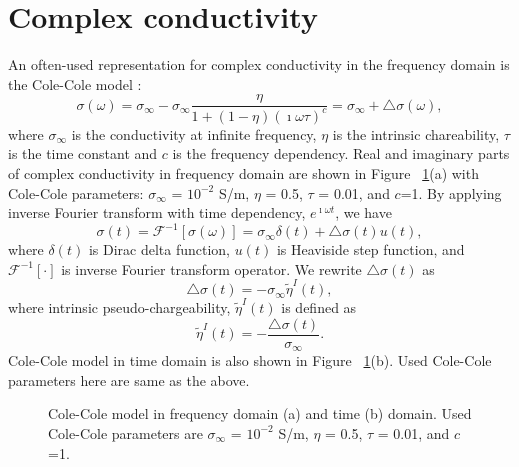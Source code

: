 \documentclass[extra,mreferee]{gji}
\newcommand{\siginf}{\sigma_\infty}
\newcommand{\dsig}{\triangle\sigma}
\newcommand{\peta}{\tilde{\eta}}
\begin{document}
\section{Complex conductivity}
An often-used representation for complex conductivity in the frequency domain is the Cole-Cole model \cite{COLE}:
\begin{equation}
  \sigma(\omega) = \sigma_{\infty} - \sigma_{\infty}\frac{\eta}{1+(1-\eta)(\imath\omega\tau)^c} = \sigma_{\infty} + \triangle\sigma(\omega),
  \label{eq: sigma_freq}
\end{equation}
where $\sigma_{\infty}$ is the conductivity at infinite frequency, $\eta$ is the intrinsic chareability, $\tau$ is the time constant and $c$ is the frequency dependency. Real and imaginary parts of complex conductivity in frequency domain are shown in Figure ~\ref{Fig:FDandTDCole}(a) with Cole-Cole parameters: $\siginf$ = $10^{-2}$ S/m, $\eta $ = 0.5, $\tau$ = 0.01, and $c$=1. By applying inverse Fourier transform with time dependency, $e^{\imath\omega t}$, we have
\begin{equation}
  \sigma(t) = \mathscr{F}^{-1}[\sigma(\omega)] = \sigma_{\infty}\delta(t) + \triangle\sigma(t)u(t),
  \label{eq: sigma_time}
\end{equation}
where $\delta(t)$ is Dirac delta function, $u(t)$ is Heaviside step function, and $\mathscr{F}^{-1}[\cdot]$ is inverse Fourier transform operator. 
We rewrite $\dsig(t)$ as 
\begin{equation}
  \dsig(t) = - \siginf\peta^{I}(t),
  \label{eq: sigma_time_c1}
\end{equation}
where intrinsic pseudo-chargeability, $\peta^{I}(t)$ is defined as
\begin{equation}
    \peta^{I}(t) = -\frac{\dsig(t)}{\siginf}. %
    \label{eq: intrinsic_peta}
\end{equation}
Cole-Cole model in time domain is also shown in Figure ~\ref{Fig:FDandTDCole}(b). Used Cole-Cole parameters here are same as the above.

\begin{figure}
  \caption{Cole-Cole model in frequency domain (a) and time (b) domain. Used Cole-Cole parameters are $\siginf$ = $10^{-2}$ S/m, $\eta $ = 0.5, $\tau$ = 0.01, and $c$=1.}
  \label{Fig:FDandTDCole}
\end{figure}

\end{document}

